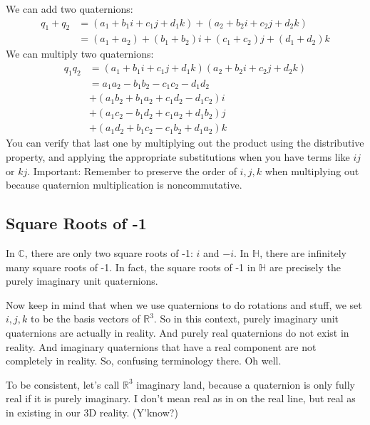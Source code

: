 \documentclass[12pt]{article}
\begin{document}
	We can add two quaternions:
		\begin{align*}
			q_1 + q_2 &= (a_1 + b_1i + c_1j + d_1k) + (a_2 + b_2i + c_2j + d_2k) \\
					  &= (a_1 + a_2) + (b_1 + b_2)i + (c_1 + c_2)j + (d_1 + d_2)k				  
		\end{align*}
	We can multiply two quaternions:
		\begin{align*}
			q_1 q_2 &= (a_1 + b_1i + c_1j + d_1k)(a_2 + b_2i + c_2j + d_2k) \\
					&= a_1a_2 - b_1b_2 - c_1c_2 - d_1d_2 \\
					&+ (a_1b_2 + b_1a_2 + c_1d_2 - d_1c_2)i \\
					&+ (a_1c_2 - b_1d_2 + c_1a_2 + d_1b_2)j \\
					&+ (a_1d_2 + b_1c_2 - c_1b_2 + d_1a_2)k
		\end{align*}
	You can verify that last one by multiplying out the product using the distributive property, and applying the appropriate substitutions when you have terms like $ij$ or $kj$. 
	Important: Remember to preserve the order of $i, j, k$ when multiplying out because quaternion multiplication is noncommutative.
	
	\subsection{Square Roots of -1}

	In $\mathbb{C}$, there are only two square roots of -1: $i$ and $-i$. 
	In $\mathbb{H}$, there are infinitely many square roots of -1. 
	In fact, the square roots of -1 in $\mathbb{H}$ are precisely the purely imaginary unit quaternions.
	
	Now keep in mind that when we use quaternions to do rotations and stuff, we set $i, j, k$ to be the basis vectors of $\mathbb{R}^3$. 
	So in this context, purely imaginary unit quaternions are actually in reality. 
	And purely real quaternions do not exist in reality. 
	And imaginary quaternions that have a real component are not completely in reality. 
	So, confusing terminology there. 
	Oh well.

	To be consistent, let's call $\mathbb{R}^3$ imaginary land, because a quaternion is only fully real if it is purely imaginary. 
	I don't mean real as in on the real line, but real as in existing in our 3D reality. (Y'know?)
	
	\iffalse
		Is this real life? Is this just fantasy? Caught in a landslide. No escape from reality.
	\fi
	
\end{document}
